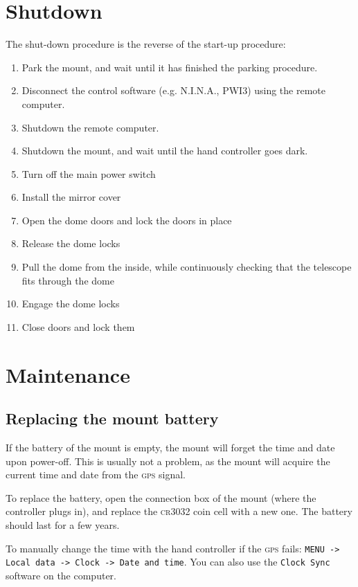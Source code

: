 \documentclass[a4paper, 11pt, fleqn]{memoir}
\begin{document}
\section{Shutdown}
\label{shutdown}

The shut-down procedure is the reverse of the start-up procedure:
\begin{enumerate}
    \item Park the mount, and wait until it has finished the parking procedure.
    \item Disconnect the control software (e.g.
          N.I.N.A., PWI3) using the remote computer.
    \item Shutdown the remote computer.
    \item Shutdown the mount, and wait until the hand controller goes dark.
    \item Turn off the main power switch
    \item Install the mirror cover
    \item Open the dome doors and lock the doors in place
    \item Release the dome locks
    \item Pull the dome from the inside, while continuously checking that the telescope fits through the dome
    \item Engage the dome locks
    \item Close doors and lock them
\end{enumerate}

\section{Maintenance}

\subsection{Replacing the mount battery}
\label{sec:mount-battery-replace}

If the battery of the mount is empty, the mount will forget the time and date upon power-off.
This is usually not a problem, as the mount will acquire the current time and date from the \textsc{gps} signal.

To replace the battery, open the connection box of the mount (where the controller plugs in), and replace the \textsc{cr3032} coin cell with a new one.
The battery should last for a few years.

To manually change the time with the hand controller if the \textsc{gps} fails: \texttt{MENU -> Local data -> Clock -> Date and time}.
You can also use the \texttt{Clock Sync} software on the computer.
\end{document}
